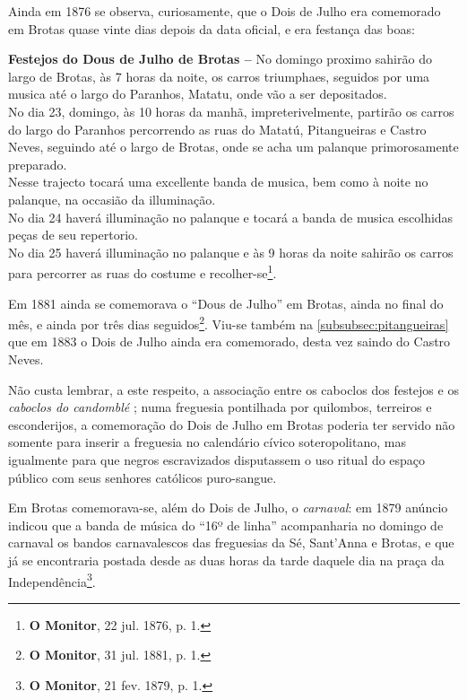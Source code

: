 Ainda em 1876 se observa, curiosamente, que o Dois de Julho era comemorado em Brotas quase vinte dias depois da data oficial, e era festança das boas:

\begin{citacao}
\textbf{Festejos do Dous de Julho de Brotas --} No domingo proximo sahirão do largo de Brotas, às 7 horas da noite, os carros triumphaes, seguidos por uma musica até o largo do Paranhos, Matatu, onde vão a ser depositados. \\
No dia 23, domingo, às 10 horas da manhã, impreterivelmente, partirão os carros do largo do Paranhos percorrendo as ruas do Matatú, Pitangueiras e Castro Neves, seguindo até o largo de Brotas, onde se acha um palanque primorosamente preparado. \\
Nesse trajecto tocará uma excellente banda de musica, bem como à noite no palanque, na occasião da illuminação. \\
No dia 24 haverá illuminação no palanque e tocará a banda de musica escolhidas peças de seu repertorio. \\
No dia 25 haverá illuminação no palanque e às 9 horas da noite sahirão os carros para percorrer as ruas do costume e recolher-se\footnote{\textbf{O Monitor}, 22 jul. 1876, p. 1.}.
\end{citacao}

Em 1881 ainda se comemorava o ``Dous de Julho'' em Brotas, ainda no final do mês, e ainda por três dias seguidos\footnote{\textbf{O Monitor}, 31 jul. 1881, p. 1.}. Viu-se também na \autoref{subsubsec:pitangueiras} que em 1883 o Dois de Julho ainda era comemorado, desta vez saindo do Castro Neves.

Não custa lembrar, a este respeito, a associação entre os caboclos dos festejos e os \textit{caboclos do candomblé} \cite[p.~88-91]{albuquerque_doisdejulho_1997}; numa freguesia pontilhada por quilombos, terreiros e esconderijos, a comemoração do Dois de Julho em Brotas poderia ter servido não somente para inserir a freguesia no calendário cívico soteropolitano, mas igualmente para que negros escravizados disputassem o uso ritual do espaço público com seus senhores católicos puro-sangue. 

Em Brotas comemorava-se, além do Dois de Julho, o \textit{carnaval}: em 1879 anúncio indicou que a banda de música do ``16º de linha'' acompanharia no domingo de carnaval os bandos carnavalescos das freguesias da Sé, Sant'Anna e Brotas, e que já se encontraria postada desde as duas horas da tarde daquele dia na praça da Independência\footnote{\textbf{O Monitor}, 21 fev. 1879, p. 1.}.

